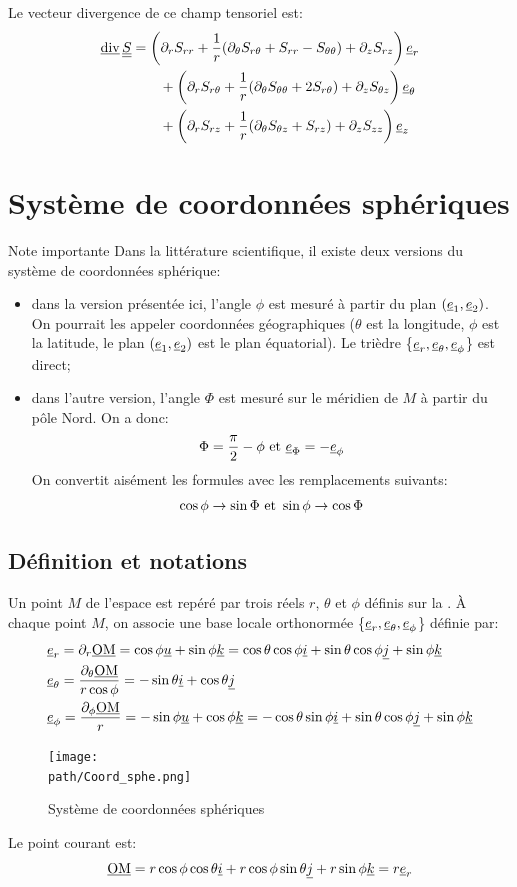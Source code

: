 \documentclass[10pt]{book}
\def\path{./fig}
\begin{document}
\begin{appendices}
Le vecteur divergence de ce champ tensoriel est:
\begin{equation}
\begin{aligned}
\vdiv\ten{S}&=\left(\partial_{r}S_{rr}+\frac{1}{r}(\partial_{\theta}S_{r\theta}+S_{rr}-S_{\theta\theta})+\partial_{z}S_{rz}\right)\er\\
&\qquad +\left(\partial_{r}S_{r\theta}+\frac{1}{r}(\partial_{\theta} S_{\theta\theta}+2S_{r\theta})+\partial_{z}S_{\theta z}\right)\etheta\\
&\qquad +\left(\partial_{r}S_{rz}+\frac{1}{r}(\partial_{\theta}S_{\theta z}+S_{rz})+\partial_{z}S_{zz}\right)\ez
\end{aligned}
\label{eq:formulaire_div_cyl_ten}
\end{equation}
\section{Système de coordonnées sphériques}
Note importante Dans la littérature scientifique, il existe deux versions du système de coordonnées sphérique:
\begin{itemize}
\item dans la version présentée ici, l'angle $\phi$ est mesuré à partir du plan $(\underline{e}_{1},\underline{e}_{2})$. On pourrait les appeler \og coordonnées géographiques \fg{} ($\theta$ est la longitude, $\phi$ est la latitude, le plan $(\underline{e}_{1},\underline{e}_{2})$ est le plan équatorial). Le trièdre \{$\underline{e}_{r},\underline{e}_{\theta},\underline{e}_{\phi}$\} est direct;
\item dans l'autre version, l'angle $\Phi$ est mesuré sur le méridien de $M$ à partir du pôle Nord. On a donc:
$$\Phi=\frac{\pi}{2}-\phi\text{ et } \underline{e}_{\Phi}=-\underline{e}_{\phi}$$
On convertit aisément les formules avec les remplacements suivants:
$$\cos\phi\rightarrow\sin\Phi\text{ et } \sin\phi\rightarrow\cos\Phi$$
\end{itemize}
\subsection{Définition et notations}
Un point $M$ de l'espace est repéré par trois réels $r$, $\theta$ et $\phi$ définis sur la . À chaque point $M$, on associe une base locale orthonormée \{$\underline{e}_{r},\underline{e}_{\theta},\underline{e}_{\phi}$\} définie par:
$$\begin{aligned}
&\underline{e}_{r}=\partial_{r}\underline{\mathrm{OM}}=\cos\phi\underline{u}+\sin\phi\underline{k}=\cos\theta \cos\phi\underline{i}+\sin\theta \cos\phi\underline{j}+\sin\phi\underline{k}\\
&\underline{e}_{\theta}=\frac{\partial_{\theta}\underline{\mathrm{OM}}}{r\cos\phi}=-\sin\theta\underline{i}+\cos\theta\underline{j}\\
&\underline{e}_{\phi}=\dfrac{\partial_{\phi}\underline{\mathrm{OM}}}{r}=-\sin\phi\underline{u}+\cos\phi\underline{k}=-\cos\theta \sin\phi\underline{i}+\sin\theta \cos\phi\underline{j}+\sin\phi\underline{k}
\end{aligned}$$
\begin{figure}[h!]
\centering \texttt{[image: \\path/Coord\_sphe.png]}
\caption{Système de coordonnées sphériques}
\label{fig:C_2}
\end{figure}
Le point courant est:
$$\underline{\mathrm{OM}}=r\cos\phi\cos\theta\underline{i}+r\cos\phi\sin\theta\underline{j}+r\sin\phi\underline{k}=r\underline{e}_{r}$$

\end{appendices}
\end{document}

